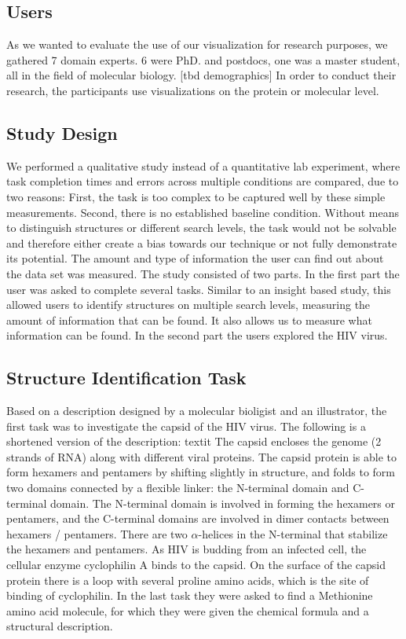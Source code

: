 \documentclass[review,journal]{vgtc}         %
\begin{document}
\subsection{Users}
As we wanted to evaluate the use of our visualization for research purposes, we gathered 7 domain experts. 
6 were PhD. and postdocs, one was a master student, all in the field of molecular biology. [tbd demographics]
In order to conduct their research, the participants use visualizations on the protein or molecular level.


\subsection{Study Design}
We performed a qualitative study instead of a quantitative lab experiment, where task completion times and errors across multiple conditions are compared, due to two reasons: First, the task is too complex to be captured well by these simple measurements. 
Second, there is no established baseline condition.
Without means to distinguish structures or different search levels, the task would not be solvable and therefore either create a bias towards our technique or not fully demonstrate its potential.
The amount and type of information the user can find out about the data set was measured. 
The study consisted of two parts. In the first part the user was asked to complete several tasks. 
Similar to an insight based study, this allowed users to identify structures on multiple search levels, measuring the amount of information that can be found.
It also allows us to measure what information can be found.  
In the second part the users explored the HIV virus. 



\subsection{Structure Identification Task}
Based on a description designed by a molecular bioligist and an illustrator, the first task was to investigate the capsid of the HIV virus. 
The following is a shortened version of the description:
textit{
The capsid encloses the genome (2 strands of RNA) along with different viral proteins. 
The capsid protein is able to form hexamers and pentamers by shifting slightly in structure, and folds to form two domains connected by a flexible linker: the N-terminal domain and C-terminal domain. 
The N-terminal domain is involved in forming the hexamers or pentamers, and the C-terminal domains are involved in dimer contacts between hexamers / pentamers. 
There are two $\alpha$-helices in the N-terminal that stabilize the hexamers and pentamers. 
As HIV is budding from an infected cell, the cellular enzyme cyclophilin A binds to the capsid. 
On the surface of the capsid protein there is a loop with several proline amino acids, which is the site of binding of cyclophilin.}
In the last task they were asked to find a Methionine amino acid molecule, for which they were given the chemical formula and a structural description.
\end{document}
